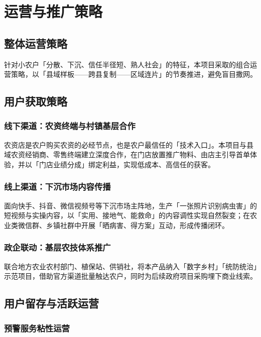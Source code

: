 \chapter{运营与推广策略}

\section{整体运营策略}

针对小农户「分散、下沉、信任半径短、熟人社会」的特征，本项目采取的组合运营策略，以「县域样板——跨县复制——区域连片」的节奏推进，避免盲目撒网。

\section{用户获取策略}

\subsection{线下渠道：农资终端与村镇基层合作}

农资店是农户购买农资的必经节点，也是农户最信任的「技术入口」。本项目与县域农资经销商、零售终端建立深度合作，在门店放置推广物料、由店主引导首单体验，并以「门店业绩分成」绑定利益，实现低成本、高信任的获客。

\subsection{线上渠道：下沉市场内容传播}

面向快手、抖音、微信视频号等下沉市场主阵地，生产「一张照片识别病虫害」的短视频与实操内容，以「实用、接地气、能救命」的内容调性实现自然裂变；在农业类微信群、乡镇社群中开展「晒病害、得方案」互动，形成传播闭环。

\subsection{政企联动：基层农技体系推广}

联合地方农业农村部门、植保站、供销社，将本产品纳入「数字乡村」「统防统治」示范项目，借助官方渠道批量触达农户，同时为后续政府项目采购埋下商业线索。

\section{用户留存与活跃运营}

\subsection{预警服务粘性运营}

